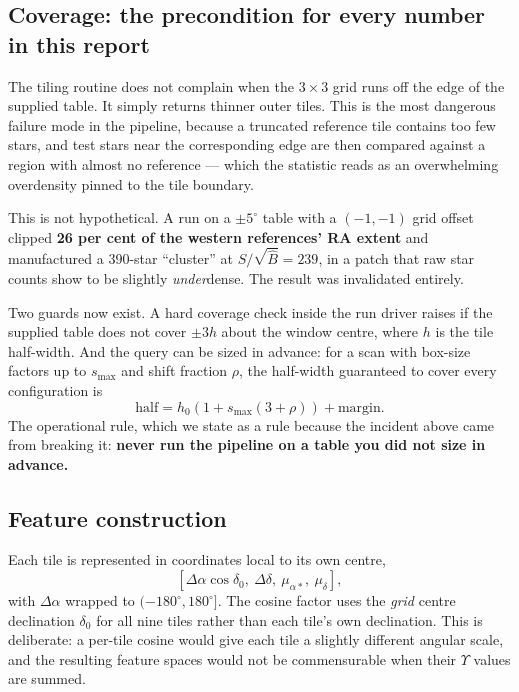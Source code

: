 \documentclass[11pt,a4paper]{article}
\newcommand{\Ups}{\Upsilon}                  %
\newcommand{\Ups}{\Upsilon}
\newcommand{\Bhat}{\hat{B}}
\newcommand{\srb}{S/\sqrt{\Bhat}}
\newcommand{\dg}{^{\circ}}
\begin{document}
\subsection{Coverage: the precondition for every number in this report}
\label{sec:coverage}

The tiling routine does not complain when the $3\times3$ grid runs off the edge of the supplied
table. It simply returns thinner outer tiles. This is the most dangerous failure mode in the
pipeline, because a truncated reference tile contains too few stars, and test stars near the
corresponding edge are then compared against a region with almost no reference --- which the
statistic reads as an overwhelming overdensity pinned to the tile boundary.

This is not hypothetical. A run on a $\pm5\dg$ table with a $(-1,-1)$ grid offset clipped
\textbf{26 per cent of the western references' RA extent} and manufactured a 390-star ``cluster''
at $\srb = 239$, in a patch that raw star counts show to be slightly \emph{under}dense. The result
was invalidated entirely.

Two guards now exist. A hard coverage check inside the run driver raises if the supplied table does
not cover $\pm 3h$ about the window centre, where $h$ is the tile half-width. And the query can be
sized in advance: for a scan with box-size factors up to $s_{\max}$ and shift fraction $\rho$, the
half-width guaranteed to cover every configuration is
%
\begin{equation}
\mathrm{half} = h_0\left(1 + s_{\max}(3 + \rho)\right) + \mathrm{margin}.
\end{equation}
%
The operational rule, which we state as a rule because the incident above came from breaking it:
\textbf{never run the pipeline on a table you did not size in advance.}

\subsection{Feature construction}

Each tile is represented in coordinates local to its own centre,
%
\begin{equation}
\left[\Delta\alpha \cos\delta_0,\ \Delta\delta,\ \mu_{\alpha*},\ \mu_\delta\right],
\end{equation}
%
with $\Delta\alpha$ wrapped to $(-180\dg, 180\dg]$. The cosine factor uses the \emph{grid} centre
declination $\delta_0$ for all nine tiles rather than each tile's own declination. This is
deliberate: a per-tile cosine would give each tile a slightly different angular scale, and the
resulting feature spaces would not be commensurable when their $\Ups$ values are summed.
\end{document}
